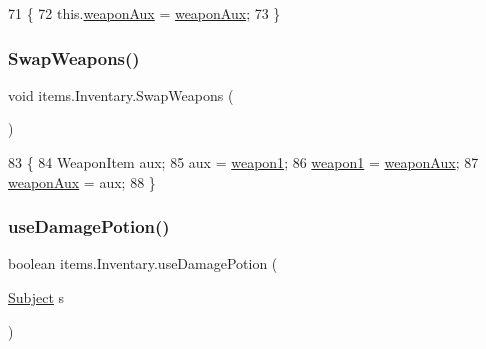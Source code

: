 \begin{DoxyCode}
71                                                    \{
72         this.\mbox{\hyperlink{classitems_1_1_inventary_a1f8cf512e097112b449136da9c6670b7}{weaponAux}} = \mbox{\hyperlink{classitems_1_1_inventary_a1f8cf512e097112b449136da9c6670b7}{weaponAux}};
73     \}
\end{DoxyCode}
\mbox{\label{classitems_1_1_inventary_aa690ec2080d618693b97a6a27246098b}} 
\subsubsection{\texorpdfstring{Swap\+Weapons()}{SwapWeapons()}}
{\footnotesize\ttfamily void items.\+Inventary.\+Swap\+Weapons (\begin{DoxyParamCaption}{ }\end{DoxyParamCaption})\hspace{0.3cm}{\ttfamily [inline]}}


\begin{DoxyCode}
83                               \{
84         WeaponItem aux;
85         aux = \mbox{\hyperlink{classitems_1_1_inventary_ad16ddfb714d749294e1fe64841ca9074}{weapon1}};
86         \mbox{\hyperlink{classitems_1_1_inventary_ad16ddfb714d749294e1fe64841ca9074}{weapon1}} = \mbox{\hyperlink{classitems_1_1_inventary_a1f8cf512e097112b449136da9c6670b7}{weaponAux}};
87         \mbox{\hyperlink{classitems_1_1_inventary_a1f8cf512e097112b449136da9c6670b7}{weaponAux}} = aux;
88     \}
\end{DoxyCode}
\mbox{\label{classitems_1_1_inventary_a648ae01539c92790718993880a097e55}} 
\subsubsection{\texorpdfstring{use\+Damage\+Potion()}{useDamagePotion()}}
{\footnotesize\ttfamily boolean items.\+Inventary.\+use\+Damage\+Potion (\begin{DoxyParamCaption}\item[{\mbox{\hyperlink{classentities_1_1_subject}{Subject}}}]{s }\end{DoxyParamCaption})\hspace{0.3cm}{\ttfamily [inline]}}


